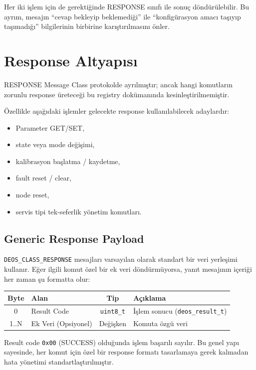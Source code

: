 \documentclass[a4paper,10pt]{article}
\newcommand{\hex}[1]{\texttt{0x#1}}
\newcommand{\code}[1]{\texttt{#1}}
\begin{document}
Her iki işlem için de gerektiğinde RESPONSE sınıfı ile sonuç döndürülebilir. Bu ayrım,
mesajın ``cevap bekleyip beklemediği'' ile ``konfigürasyon amacı taşıyıp taşımadığı''
bilgilerinin birbirine karıştırılmasını önler.

\section{Response Altyapısı}

RESPONSE Message Class protokolde ayrılmıştır; ancak hangi komutların zorunlu response
üreteceği bu registry dokümanında kesinleştirilmemiştir.

Özellikle aşağıdaki işlemler gelecekte response kullanılabilecek adaylardır:
\begin{itemize}
    \item Parameter GET/SET,
    \item state veya mode değişimi,
    \item kalibrasyon başlatma / kaydetme,
    \item fault reset / clear,
    \item node reset,
    \item servis tipi tek-seferlik yönetim komutları.
\end{itemize}

\subsection{Generic Response Payload}

\code{DEOS\_CLASS\_RESPONSE} mesajları varsayılan olarak standart bir veri yerleşimi kullanır. Eğer ilgili komut özel bir ek veri döndürmüyorsa, yanıt mesajının içeriği her zaman şu formatta olur:

\begin{center}
\begin{tabularx}{\textwidth}{c l c X}
\toprule
Byte & Alan & Tip & Açıklama \\
\midrule
0 & Result Code & \code{uint8\_t} & İşlem sonucu (\code{deos\_result\_t}) \\
1..N & Ek Veri (Opsiyonel) & Değişken & Komuta özgü veri \\
\bottomrule
\end{tabularx}
\end{center}

Result code \hex{00} (SUCCESS) olduğunda işlem başarılı sayılır. Bu genel yapı sayesinde, her komut için özel bir response formatı tasarlamaya gerek kalmadan hata yönetimi standartlaştırılmıştır.
\end{document}
